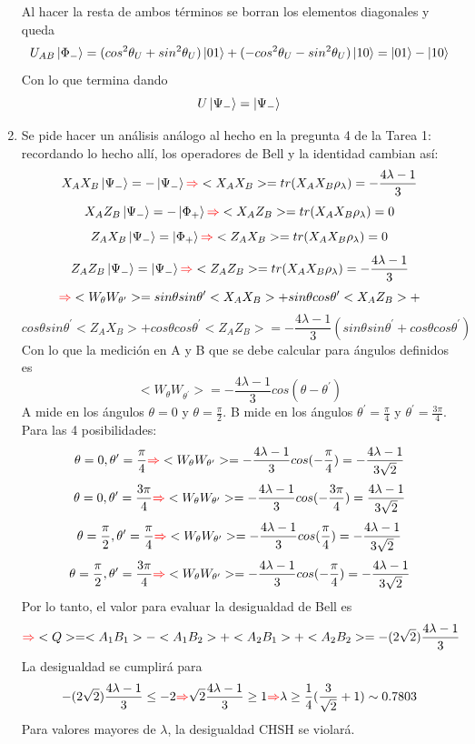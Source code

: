 \documentclass{book}
\begin{document}
\begin{enumerate}
      Al hacer la resta de ambos términos se borran los elementos diagonales y queda
      $$U_{AB}\ket{\Phi_-}=(cos^2\theta_U+sin^2\theta_U)\ket{01}+(-cos^2\theta_U-sin^2\theta_U)\ket{10}=\ket{01}-\ket{10}$$
      Con lo que termina dando 
      $$ U\ket{\Psi_-}=\ket{\Psi_-}$$
    \item Se pide hacer un análisis análogo al hecho en la pregunta 4 de la Tarea 1: recordando lo hecho allí, los operadores de Bell y la identidad cambian así: 
    $$ X_AX_B\ket{\Psi_-}=-\ket{\Psi_-} \textcolor{red}{\Rightarrow} <X_AX_B>=tr(X_AX_B\rho_\lambda)=-\frac{4\lambda-1}{3}$$
    $$ X_AZ_B\ket{\Psi_-}=-\ket{\Phi_+} \textcolor{red}{\Rightarrow} <X_AZ_B>=tr(X_AX_B\rho_\lambda)=0$$
    $$ Z_AX_B\ket{\Psi_-}=\ket{\Phi_+} \textcolor{red}{\Rightarrow} <Z_AX_B>=tr(X_AX_B\rho_\lambda)=0$$ 
    $$ Z_AZ_B\ket{\Psi_-}=\ket{\Psi_-} \textcolor{red}{\Rightarrow} <Z_AZ_B>=tr(X_AX_B\rho_\lambda)=-\frac{4\lambda-1}{3}$$
    $$ \textcolor{red}{\Rightarrow} <W_\theta W_{\theta^\prime}>=sin\theta sin \theta^\prime<X_AX_B>+sin\theta cos\theta^\prime<X_AZ_B>+$$ $$cos\theta sin\theta^\prime <Z_AX_B>+cos\theta cos\theta^\prime<Z_AZ_B>=-\frac{4\lambda-1}{3}(sin\theta sin\theta^\prime+cos\theta cos\theta^\prime)$$
    Con lo que la medición en A y B que se debe calcular para ángulos definidos es 
    $$<W_\theta W_{\theta^\prime}>=-\frac{4\lambda-1}{3}cos(\theta-\theta^\prime) $$
    A mide en los ángulos $\theta=0$ y $\theta=\frac{\pi}{2}$. B mide en los ángulos $\theta^\prime=\frac{\pi}{4}$ y $\theta^\prime=\frac{3\pi}{4}$. Para las 4 posibilidades:
    $$\theta=0,\theta^\prime=\frac{\pi}{4}\textcolor{red}{\Rightarrow} <W_\theta W_{\theta^\prime}>=-\frac{4\lambda-1}{3}cos(-\frac{\pi}{4})=-\frac{4\lambda-1}{3\sqrt{2}}$$ 
    $$\theta=0, \theta^\prime=\frac{3\pi}{4}\textcolor{red}{\Rightarrow}  <W_\theta W_{\theta^\prime}>=-\frac{4\lambda-1}{3}cos(-\frac{3\pi}{4})=\frac{4\lambda-1}{3\sqrt{2}}$$
    $$\theta=\frac{\pi}{2},\theta^\prime=\frac{\pi}{4}\textcolor{red}{\Rightarrow}  <W_\theta W_{\theta^\prime}>=-\frac{4\lambda-1}{3}cos(\frac{\pi}{4})=-\frac{4\lambda-1}{3\sqrt{2}}$$ 
    $$\theta=\frac{\pi}{2}, \theta^\prime=\frac{3\pi}{4}\textcolor{red}{\Rightarrow}  <W_\theta W_{\theta^\prime}>=-\frac{4\lambda-1}{3}cos(-\frac{\pi}{4})=-\frac{4\lambda-1}{3\sqrt{2}}$$
    Por lo tanto, el valor para evaluar la desigualdad de Bell es 
    $$\textcolor{red}{\Rightarrow} <Q>=<A_1B_1>-<A_1B_2>+<A_2B_1>+<A_2B_2>=-(2\sqrt{2})\frac{4\lambda-1}{3} $$
    La desigualdad se cumplirá para
    $$ -(2\sqrt{2})\frac{4\lambda-1}{3} \leq -2\textcolor{red}{\Rightarrow} \sqrt{2}\frac{4\lambda-1}{3} \geq 1\textcolor{red}{\Rightarrow} \lambda\geq\frac{1}{4}(\frac{3}{\sqrt{2}}+1)\sim 0.7803$$
    Para valores mayores de $\lambda$, la desigualdad CHSH se violará.
\end{enumerate}
\end{document}
